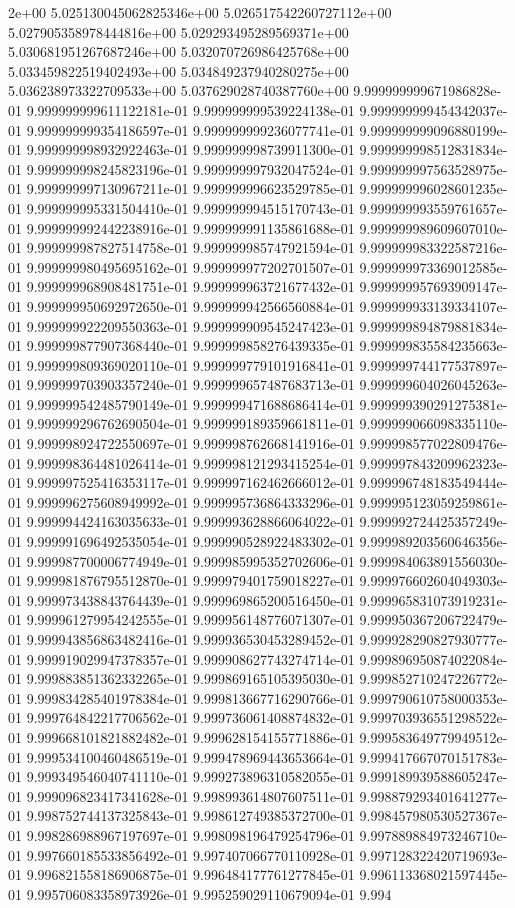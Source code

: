 2e+00	5.025130045062825346e+00	5.026517542260727112e+00	5.027905358978444816e+00	5.029293495289569371e+00	5.030681951267687246e+00	5.032070726986425768e+00	5.033459822519402493e+00	5.034849237940280275e+00	5.036238973322709533e+00	5.037629028740387760e+00
9.999999999671986828e-01	9.999999999611122181e-01	9.999999999539224138e-01	9.999999999454342037e-01	9.999999999354186597e-01	9.999999999236077741e-01	9.999999999096880199e-01	9.999999998932922463e-01	9.999999998739911300e-01	9.999999998512831834e-01	9.999999998245823196e-01	9.999999997932047524e-01	9.999999997563528975e-01	9.999999997130967211e-01	9.999999996623529785e-01	9.999999996028601235e-01	9.999999995331504410e-01	9.999999994515170743e-01	9.999999993559761657e-01	9.999999992442238916e-01	9.999999991135861688e-01	9.999999989609607010e-01	9.999999987827514758e-01	9.999999985747921594e-01	9.999999983322587216e-01	9.999999980495695162e-01	9.999999977202701507e-01	9.999999973369012585e-01	9.999999968908481751e-01	9.999999963721677432e-01	9.999999957693909147e-01	9.999999950692972650e-01	9.999999942566560884e-01	9.999999933139334107e-01	9.999999922209550363e-01	9.999999909545247423e-01	9.999999894879881834e-01	9.999999877907368440e-01	9.999999858276439335e-01	9.999999835584235663e-01	9.999999809369020110e-01	9.999999779101916841e-01	9.999999744177537897e-01	9.999999703903357240e-01	9.999999657487683713e-01	9.999999604026045263e-01	9.999999542485790149e-01	9.999999471688686414e-01	9.999999390291275381e-01	9.999999296762690504e-01	9.999999189359661811e-01	9.999999066098335110e-01	9.999998924722550697e-01	9.999998762668141916e-01	9.999998577022809476e-01	9.999998364481026414e-01	9.999998121293415254e-01	9.999997843209962323e-01	9.999997525416353117e-01	9.999997162462666012e-01	9.999996748183549444e-01	9.999996275608949992e-01	9.999995736864333296e-01	9.999995123059259861e-01	9.999994424163035633e-01	9.999993628866064022e-01	9.999992724425357249e-01	9.999991696492535054e-01	9.999990528922483302e-01	9.999989203560646356e-01	9.999987700006774949e-01	9.999985995352702606e-01	9.999984063891556030e-01	9.999981876795512870e-01	9.999979401759018227e-01	9.999976602604049303e-01	9.999973438843764439e-01	9.999969865200516450e-01	9.999965831073919231e-01	9.999961279954242555e-01	9.999956148776071307e-01	9.999950367206722479e-01	9.999943856863482416e-01	9.999936530453289452e-01	9.999928290827930777e-01	9.999919029947378357e-01	9.999908627743274714e-01	9.999896950874022084e-01	9.999883851362332265e-01	9.999869165105395030e-01	9.999852710247226772e-01	9.999834285401978384e-01	9.999813667716290766e-01	9.999790610758000353e-01	9.999764842217706562e-01	9.999736061408874832e-01	9.999703936551298522e-01	9.999668101821882482e-01	9.999628154155771886e-01	9.999583649779949512e-01	9.999534100460486519e-01	9.999478969443653664e-01	9.999417667070151783e-01	9.999349546040741110e-01	9.999273896310582055e-01	9.999189939588605247e-01	9.999096823417341628e-01	9.998993614807607511e-01	9.998879293401641277e-01	9.998752744137325843e-01	9.998612749385372700e-01	9.998457980530527367e-01	9.998286988967197697e-01	9.998098196479254796e-01	9.997889884973246710e-01	9.997660185533856492e-01	9.997407066770110928e-01	9.997128322420719693e-01	9.996821558186906875e-01	9.996484177761277845e-01	9.996113368021597445e-01	9.995706083358973926e-01	9.995259029110679094e-01	9.994